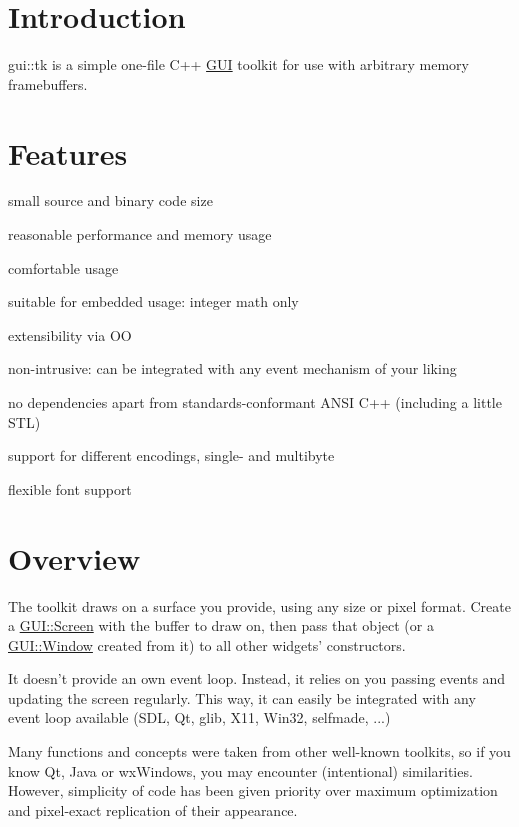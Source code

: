 \hypertarget{index_i}{}\section{Introduction}\label{index_i}
gui\-::tk is a simple one-\/file C++ \hyperlink{namespaceGUI}{G\-U\-I} toolkit for use with arbitrary memory framebuffers.\hypertarget{index_f}{}\section{Features}\label{index_f}
\begin{DoxyItemize}
\item small source and binary code size \item reasonable performance and memory usage \item comfortable usage \item suitable for embedded usage\-: integer math only \item extensibility via O\-O \item non-\/intrusive\-: can be integrated with any event mechanism of your liking \item no dependencies apart from standards-\/conformant A\-N\-S\-I C++ (including a little S\-T\-L) \item support for different encodings, single-\/ and multibyte \item flexible font support\end{DoxyItemize}
\hypertarget{gui_1_1tk_o}{}\section{Overview}\label{gui_1_1tk_o}
The toolkit draws on a surface you provide, using any size or pixel format. Create a \hyperlink{classGUI_1_1Screen}{G\-U\-I\-::\-Screen} with the buffer to draw on, then pass that object (or a \hyperlink{classGUI_1_1Window}{G\-U\-I\-::\-Window} created from it) to all other widgets' constructors.

It doesn't provide an own event loop. Instead, it relies on you passing events and updating the screen regularly. This way, it can easily be integrated with any event loop available (S\-D\-L, Qt, glib, X11, Win32, selfmade, ...)

Many functions and concepts were taken from other well-\/known toolkits, so if you know Qt, Java or wx\-Windows, you may encounter (intentional) similarities. However, simplicity of code has been given priority over maximum optimization and pixel-\/exact replication of their appearance.

